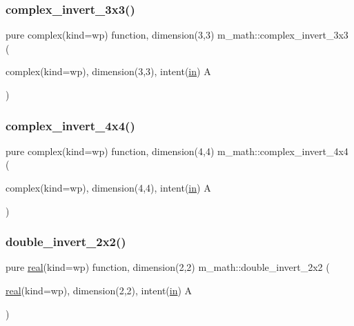 \mbox{\label{namespacem__math_a09c8d8435741d02fc85dce5435a5630d}} 
\subsubsection{\texorpdfstring{complex\+\_\+invert\+\_\+3x3()}{complex\_invert\_3x3()}}
{\footnotesize\ttfamily pure complex(kind=wp) function, dimension(3,3) m\+\_\+math\+::complex\+\_\+invert\+\_\+3x3 (\begin{DoxyParamCaption}\item[{complex(kind=wp), dimension(3,3), intent(\hyperlink{M__journal_83_8txt_afce72651d1eed785a2132bee863b2f38}{in})}]{A }\end{DoxyParamCaption})\hspace{0.3cm}{\ttfamily [private]}}

\mbox{\label{namespacem__math_a8e3ef557757711b8ace73f51e44659a6}} 
\subsubsection{\texorpdfstring{complex\+\_\+invert\+\_\+4x4()}{complex\_invert\_4x4()}}
{\footnotesize\ttfamily pure complex(kind=wp) function, dimension(4,4) m\+\_\+math\+::complex\+\_\+invert\+\_\+4x4 (\begin{DoxyParamCaption}\item[{complex(kind=wp), dimension(4,4), intent(\hyperlink{M__journal_83_8txt_afce72651d1eed785a2132bee863b2f38}{in})}]{A }\end{DoxyParamCaption})\hspace{0.3cm}{\ttfamily [private]}}

\mbox{\label{namespacem__math_ae65562df2e78e7ebc0660a8f8b3a4030}} 
\subsubsection{\texorpdfstring{double\+\_\+invert\+\_\+2x2()}{double\_invert\_2x2()}}
{\footnotesize\ttfamily pure \hyperlink{read__watch_83_8txt_abdb62bde002f38ef75f810d3a905a823}{real}(kind=wp) function, dimension(2,2) m\+\_\+math\+::double\+\_\+invert\+\_\+2x2 (\begin{DoxyParamCaption}\item[{\hyperlink{read__watch_83_8txt_abdb62bde002f38ef75f810d3a905a823}{real}(kind=wp), dimension(2,2), intent(\hyperlink{M__journal_83_8txt_afce72651d1eed785a2132bee863b2f38}{in})}]{A }\end{DoxyParamCaption})\hspace{0.3cm}{\ttfamily [private]}}

